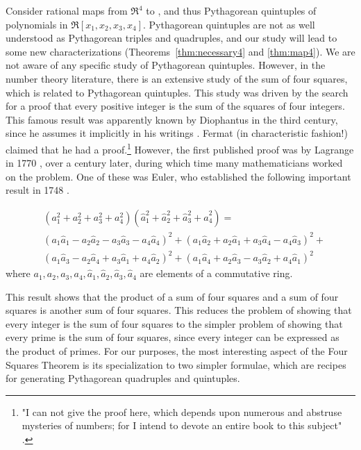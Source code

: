 Consider rational maps from $\Re^4$ to , and thus
Pythagorean quintuples of polynomials in \linebreak $\Re[x_1,x_2,x_3,x_4]$.
Pythagorean quintuples are not as well understood as Pythagorean triples
and quadruples, and our study will lead to some new characterizations
(Theorems~\ref{thm:necessary4} and \ref{thm:map4}).
We are not aware of any specific study of Pythagorean quintuples.
However, in the number theory literature, there is an extensive study of the
sum of four squares, which is related to Pythagorean quintuples.
This study was driven by the search for a proof that
every positive integer is the sum of the squares of four integers.
This famous result was apparently known by Diophantus in the third century,
since he assumes it implicitly in his writings \cite{dickson52}. %
Fermat (in characteristic fashion!) claimed that he had a proof.\footnote{"I can
	not give the proof here, which depends upon numerous and abstruse
	mysteries of numbers; for I intend to devote an entire book
	to this subject" \cite[p. 6]{dickson52}.}
However, the first published proof was by Lagrange in 1770 \cite{herstein75}, %
over a century later,
during which time many mathematicians worked on the problem.
One of these was Euler, who established the following important result in 1748
\cite{dickson52,herstein75}.   %

\begin{lemma}
\[
\begin{array}{ll}
& (a_1^2 + a_2^2 + a_3^2 + a_4^2) 
(\hat{a}^2_1 + \hat{a}^2_2 + \hat{a}^2_3 + \hat{a}^2_4) = \\
& (a_1 \hat{a}_1 - a_2\hat{a}_2 - a_3\hat{a}_3 - a_4\hat{a}_4)^2 +
   (a_1\hat{a}_2 + a_2\hat{a}_1 + a_3\hat{a}_4 - a_4\hat{a}_3)^2 + \\
& (a_1\hat{a}_3 - a_2\hat{a}_4 + a_3\hat{a}_1 + a_4\hat{a}_2)^2 +
   (a_1\hat{a}_4 + a_2\hat{a}_3 - a_3\hat{a}_2 + a_4\hat{a}_1)^2
\end{array}
\]
where $a_1,a_2,a_3,a_4,\hat{a}_1,\hat{a}_2,\hat{a}_3,\hat{a}_4$ are elements of a
commutative ring.
\end{lemma}

This result shows that the product of a sum of four squares and a sum of four
squares is another sum of four squares.
This reduces the problem of showing that every integer is the sum
of four squares to the simpler problem
of showing that every prime is the sum of four squares,
since every integer can be expressed as the product of primes.
For our purposes, the most interesting aspect of 
the Four Squares Theorem is its specialization to 
two simpler formulae, which are recipes for
generating Pythagorean quadruples and quintuples.

